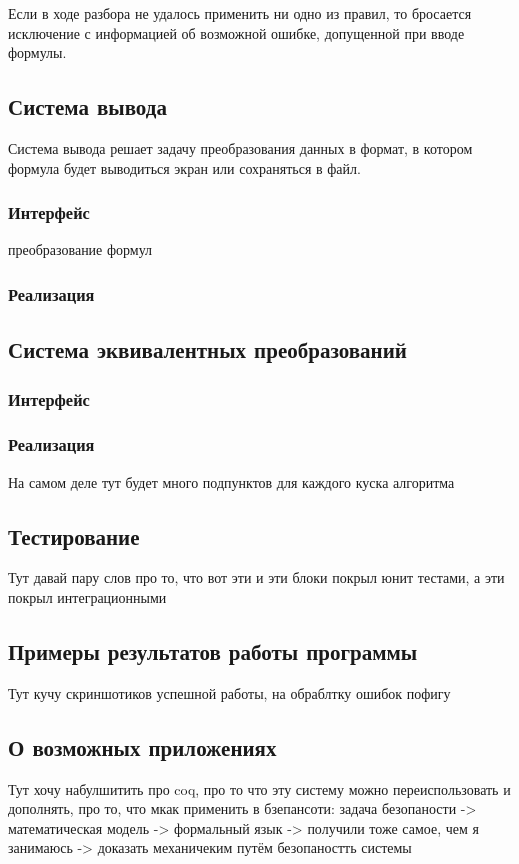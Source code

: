 Если в ходе разбора не удалось применить ни одно из правил, то бросается исключение с информацией об возможной ошибке, допущенной при вводе формулы.

\subsection{Система вывода}

Система вывода решает задачу преобразования данных в формат, в котором формула будет выводиться экран или сохраняться в файл.


\subsubsection{Интерфейс}

преобразование формул 



\subsubsection{Реализация}


\subsection{Система эквивалентных преобразований}

\subsubsection{Интерфейс}

\subsubsection{Реализация}
На самом деле тут будет много подпунктов для каждого куска алгоритма

\subsection{Тестирование}
Тут давай пару слов про то, что вот эти и эти блоки покрыл юнит тестами, а эти покрыл интеграционными

\subsection{Примеры результатов работы программы}
Тут кучу скриншотиков успешной работы, на обраблтку ошибок пофигу

\subsection{О возможных приложениях}
Тут хочу набулшитить про coq, про то что эту систему можно переиспользовать и дополнять, про то, что мкак применить в бзепансоти: задача безопаности -> математическая модель -> формальный язык -> получили тоже самое, чем я занимаюсь -> доказать механичеким путём безопаностть системы
